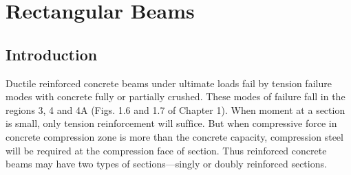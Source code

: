 
\chapter{Rectangular Beams}
\section{Introduction}Ductile reinforced concrete beams under ultimate loads fail by tension failure modes with
concrete fully or partially crushed. These modes of failure fall in the regions 3, 4 and 4A
(Figs. 1.6 and 1.7 of Chapter 1). When moment at a section is small, only tension reinforcement
will sufﬁce. But when compressive force in concrete compression zone is more than the concrete
capacity, compression steel will be required at the compression face of section. Thus reinforced
concrete beams may have two types of sections—singly or doubly reinforced sections.

